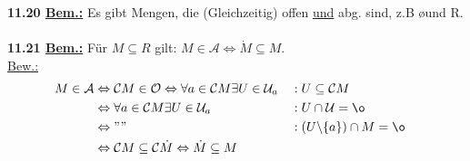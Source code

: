 \documentclass[]{scrartcl}
\begin{document}
 	\textbf{11.20 \underline{Bem.:}} Es gibt Mengen, die (Gleichzeitig) offen \underline{und} abg. sind, z.B \o und R.\\
 	\\
 	\textbf{11.21 \underline{Bem.:}} Für $M\subseteq R$ gilt:  \ul{$M\in \mathcal{A} \Leftrightarrow \dot{M}\subseteq M$}.\\
 	\underline{Bew.:} 
 		\begin{align}
 			M\in \mathcal{A} &\Leftrightarrow \mathcal{C}M\in \mathcal{O} \Leftrightarrow \forall a \in \mathcal{C}M \exists U \in \mathcal{U}_a&&:U \subseteq \mathcal{C}M&\\
 			&\Leftrightarrow \forall a \in \mathcal{C}M \exists U \in \mathcal{U}_a &&: U \cap \mathcal{U}=\o\\
 			&\Leftrightarrow""&&:(U\backslash\{a\})\cap M =\o&\\
 			&\Leftrightarrow \mathcal{C}M\subseteq\mathcal{C}\dot{M}\Leftrightarrow\dot{M}\subseteq M&
 		\end{align}
\end{document}
